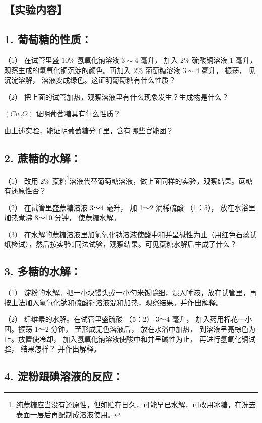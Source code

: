 \subsection{【实验内容】}

\subsection{1. 葡萄糖的性质：}

（1） 在试管里盛 \(10 \%\) 氢氧化钠溶液 \(3 \sim 4\) 毫升， 加入
\(2 \%\) 硫酸铜溶液 1 毫升， 观察生成的氢氧化铜沉淀的颜色。再加入
\(2 \%\) 葡萄糖溶液 \(3 \sim 4\) 毫升， 振荡， 见沉淀溶解，
溶液变成绿色。这证明葡萄糖有什么性质？

（2） 把上面的试管加热，观察溶液里有什么现象发生？生成物是什么？

\((Cu_{2}O)\) 证明葡萄糖具有什么性质？

由上述实验，能证明葡萄糖分子里，含有哪些官能团？

\subsection{2. 蔗糖的水解：}

（1） 改用 2\%
蔗糖\footnote{纯蔗糖应当没有还原性，但如贮存日久，可能早已水解，可改用冰糖，在洗去表面一层后再配制成溶液使用。}溶液代替葡萄糖溶液，做上面同样的实验，观察结果。蔗糖有还原性否？

（2） 在试管里盛蔗糖溶液 3～4 毫升， 加 1～2 滴稀硫酸 （1：5），
放在水浴里加热煮沸 8～10 分钟， 使蔗糖水解。

（3）
在水解的蔗糖溶液里加氢氧化钠溶液使酸中和并呈碱性为止（用红色石蕊试纸检试），然后按实验1同法试验，观察结果。可见蔗糖水解后生成了什么？

\subsection{3. 多糖的水解：}

（1）
淀粉的水解。把一小块馒头或一小勺米饭嚼细，混入唾液，放在试管里，再按上法加入氢氧化钠和硫酸铜溶液混和加热，观察结果。并作出解释。

（2） 纤维素的水解。在试管里盛硫酸 （5：2） 3～4 毫升，
加入药用棉花一小团。振荡 1～2 分钟， 至形成无色溶液后， 放在水浴中加热，
到溶液呈亮棕色为止。放置使冷却， 加入氢氧化钠溶液使酸中和并呈碱性为止，
再进行氢氧化铜试验， 结果怎样？ 并作出解释。

\subsection{4. 淀粉跟碘溶液的反应：}


